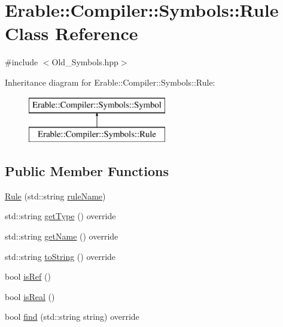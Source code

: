 \hypertarget{class_erable_1_1_compiler_1_1_symbols_1_1_rule}{}\section{Erable\+::Compiler\+::Symbols\+::Rule Class Reference}
\label{class_erable_1_1_compiler_1_1_symbols_1_1_rule}


{\ttfamily \#include $<$Old\+\_\+\+Symbols.\+hpp$>$}

Inheritance diagram for Erable\+::Compiler\+::Symbols\+::Rule\+:\begin{figure}[H]
\begin{center}
\leavevmode
\includegraphics[height=2.000000cm]{class_erable_1_1_compiler_1_1_symbols_1_1_rule}
\end{center}
\end{figure}
\subsection*{Public Member Functions}
\begin{DoxyCompactItemize}
\item 
\mbox{\hyperlink{class_erable_1_1_compiler_1_1_symbols_1_1_rule_a0af25fe6f6c335a4d7c02c16118374e1}{Rule}} (std\+::string \mbox{\hyperlink{class_erable_1_1_compiler_1_1_symbols_1_1_rule_a099515287a10e4fd5412612d852ae2ca}{rule\+Name}})
\item 
std\+::string \mbox{\hyperlink{class_erable_1_1_compiler_1_1_symbols_1_1_rule_a6e0b51b5ecaed4785480d534dc09cb8e}{get\+Type}} () override
\item 
std\+::string \mbox{\hyperlink{class_erable_1_1_compiler_1_1_symbols_1_1_rule_a6e71596b90545fe69d089a3e706e4303}{get\+Name}} () override
\item 
std\+::string \mbox{\hyperlink{class_erable_1_1_compiler_1_1_symbols_1_1_rule_a8bb5224d85a4867c71b6c1bc7ec901c0}{to\+String}} () override
\item 
bool \mbox{\hyperlink{class_erable_1_1_compiler_1_1_symbols_1_1_rule_a895300a21857442e365743bc968aeac0}{is\+Ref}} ()
\item 
bool \mbox{\hyperlink{class_erable_1_1_compiler_1_1_symbols_1_1_rule_ac76571914b4308a2df8904e0efe8302a}{is\+Real}} ()
\item 
bool \mbox{\hyperlink{class_erable_1_1_compiler_1_1_symbols_1_1_rule_a33c0d38a60e6f703fd2d947d32a48504}{find}} (std\+::string string) override
\end{DoxyCompactItemize}
